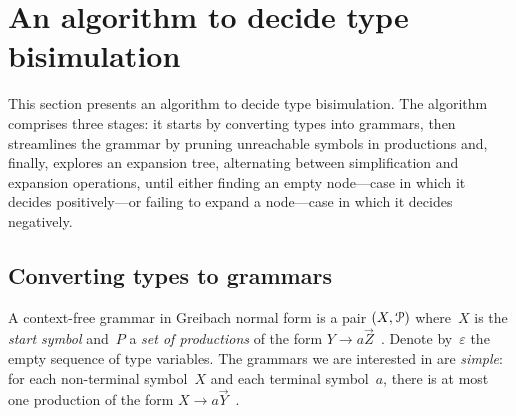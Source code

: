 \section{An algorithm to decide type bisimulation}
\label{sec:algorithm}



This section presents an algorithm to decide type bisimulation. The
algorithm comprises three stages: it starts by converting types into
grammars, then streamlines the grammar by pruning unreachable symbols
in productions and, finally, explores an expansion tree, alternating
between simplification and expansion operations, until either finding
an empty node---case in which it decides positively---or failing to
expand a node---case in which it decides negatively.

\subsection{Converting types to grammars}
\label{subsec:typeToGrammar}

A context-free grammar in Greibach normal form is a pair
$(X,\mathcal P)$ where~$X$ is the \emph{start symbol} and~$P$ a
\emph{set of productions} of the form
$Y \rightarrow a\vec Z$~\cite{GNF}. Denote by~$\varepsilon$ the empty
sequence of type variables.
%
The grammars we are interested in are \emph{simple}: for each
non-terminal symbol~$X$ and each terminal symbol~$a$, there is at most
one production of the form
$X \rightarrow a\vec Y$~\cite{simpleGrammar}.


